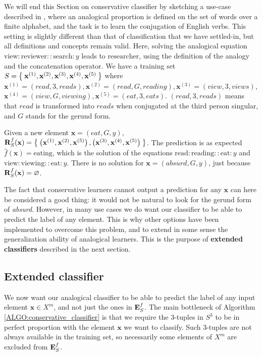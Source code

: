 We will end this Section on conservative classifier by sketching a use-case
described in \cite{StrYvoREPORT05}, where an analogical proportion is defined
on the set of words over a finite alphabet, and the task is to learn the
conjugation of English verbs. This setting is slightly different than that of
classification that we have settled-in, but all definitions and concepts remain
valid. Here, solving the analogical equation
$\text{view}:\text{reviewer}::\text{search}:y$ leads to $\text{researcher}$,
using the definition of the analogy and the concatenation operator.
We have a training set $S=\Set{\mathbf{x}^{(1)},\mathbf{x}^{(2)},
\mathbf{x}^{(3)}, \mathbf{x}^{(4)}, \mathbf{x}^{(5)}}$ where
$\mathbf{x}^{(1)}=(read,3,reads), \mathbf{x}^{(2)}=(read,G,reading),
\mathbf{x}^{(3)}=(view,3,views)$, $\mathbf{x}^{(4)}=(view,G,viewing),
\mathbf{x}^{(5)}=(eat,3,eats)$. $(read,3,reads)$ means that $read$ is
transformed into $reads$ when conjugated at the third person singular, and $G$
stands for the gerund form.

Given a new element $\mathbf{x}=(eat,G,y)$, $\mathbf{R}_{S}^{f}(\mathbf{x})=
\Set{\left(\mathbf{x}^{(1)}, \mathbf{x}^{(2)}, \mathbf{x}^{(5)}\right),
\left(\mathbf{x}^{(3)},\mathbf{x}^{(4)},\mathbf{x}^{(5)}\right)}$. The
prediction is as expected $\hat{f}(\mathbf{x})=\text{eating}$, which is the
solution of the equations $\text{read}:\text{reading}::\text{eat}:y$ and
$\text{view}:\text{viewing}::\text{eat}:y$. There is
no solution for $\mathbf{x}=(absurd,G,y)$, just because $\mathbf{R}_{S}^{f}(\mathbf{x})= \varnothing$.

The fact that conservative learners cannot output a prediction for any
$\mathbf{x}$ can here be considered a good thing: it would not be natural to
look for the gerund form of \textit{absurd}. However, in many use cases we do
want our classifier to be able to predict the label of any element. This is why
other options have been implemented to overcome this problem, and to extend in
some sense the generalization ability of analogical learners. This is the
purpose of \textbf{extended classifiers} described in the next section.

\subsection{Extended classifier}
\label{SEC:extended_classifier}

We now want our analogical classifier to be able to predict the label of any
input element $\mathbf{x} \in X^m$, and not just the ones in $\mathbf{E}_{S}^{f}$.
The main bottleneck of Algorithm \ref{ALGO:conservative_classifier} is that we
require the 3-tuples in $S^3$ to be in perfect proportion with the element
$\mathbf{x}$ we want to classify. Such 3-tuples are not always available in the
training set, so necessarily some elements of $X^m$ are excluded from $\mathbf{E}_{S}^{f}$.

